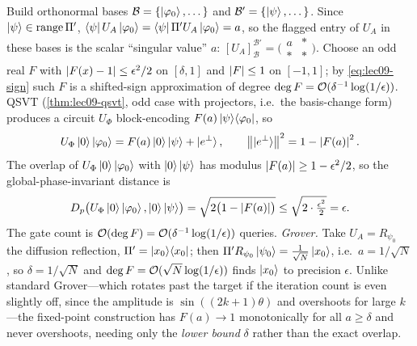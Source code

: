 \begin{solution}
Build orthonormal bases $\mathcal B=\{\ket{\varphi_0},\dots\}$ and
$\mathcal B'=\{\ket\psi,\dots\}$. Since $\ket\psi\in\operatorname{range}\Pi'$,
$\bra\psi U_A\ket{\varphi_0}=\bra\psi\Pi'U_A\ket{\varphi_0}=a$, so the flagged entry of
$U_A$ in these bases is the scalar ``singular value'' $a$: $[U_A]^{\mathcal B'}_
{\mathcal B}=\bigl(\begin{smallmatrix}a&*\\ *&*\end{smallmatrix}\bigr)$. Choose an odd
real $F$ with $\left\lvert F(x)-1 \right\rvert\le\epsilon^2/2$ on $[\delta,1]$ and $\left\lvert F \right\rvert\le1$ on
$[-1,1]$; by \eqref{eq:lec09-sign} such $F$ is a shifted-sign approximation of degree
$\deg F=\mathcal{O}(\delta^{-1}\log(1/\epsilon))$. QSVT (\cref{thm:lec09-qsvt}, odd case with
projectors, i.e.\ the basis-change form) produces a circuit $U_\Phi$ block-encoding
$F(a)\ket\psi\!\bra{\varphi_0}$, so
\[
  U_\Phi\ket0\ket{\varphi_0}=F(a)\ket0\ket\psi+\ket{e^\perp},\qquad
  \left\lVert \ket{e^\perp} \right\rVert^2=1-\left\lvert F(a) \right\rvert^2 .
\]
The overlap of $U_\Phi\ket0\ket{\varphi_0}$ with $\ket0\ket\psi$ has modulus
$\left\lvert F(a) \right\rvert\ge1-\epsilon^2/2$, so the global-phase-invariant distance is
\[
  D_p\bigl(U_\Phi\ket0\ket{\varphi_0},\ket0\ket\psi\bigr)
  =\sqrt{2\bigl(1-\left\lvert F(a) \right\rvert\bigr)}\le\sqrt{2\cdot\tfrac{\epsilon^2}2}=\epsilon .
\]
The gate count is $\mathcal{O}(\deg F)=\mathcal{O}(\delta^{-1}\log(1/\epsilon))$ queries.
\emph{Grover.} Take $U_A=R_{\psi_0}$ the diffusion reflection, $\Pi'=\ket{x_0}\!\bra{x_0}$; then
$\Pi'R_{\psi_0}\ket{\psi_0}=\tfrac1{\sqrt N}\ket{x_0}$, i.e.\ $a=1/\sqrt N$, so
$\delta=1/\sqrt N$ and $\deg F=\mathcal{O}(\sqrt N\log(1/\epsilon))$ finds $\ket{x_0}$ to
precision $\epsilon$. Unlike standard Grover---which rotates past the target if the
iteration count is even slightly off, since the amplitude is $\sin((2k+1)\theta)$ and
overshoots for large $k$---the fixed-point construction has $F(a)\to1$ monotonically for
all $a\ge\delta$ and never overshoots, needing only the \emph{lower bound} $\delta$
rather than the exact overlap.
\end{solution}

